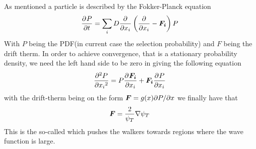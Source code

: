         As mentioned a particle is described by the Fokker-Planck equation
            \begin{equation}
                \FokkerPlanck
                \label{eq:FokkerPlanckDef}
            \end{equation}
        With $P$ being the PDF(in current case the selection probability) and
        $F$ being the drift therm. In order to achieve convergence, that is a
        stationary probability density, we need the left hand side to be zero
        in  giving the following equation
            \begin{equation}
                \prd{x_i}[P][2] = P\prd{x_i}[\mb{F_i}] + \mb{F_i}\prd{x_i}[P]
            \end{equation}
        with the drift-therm being on the form $\boldsymbol{{F}}=g(x)\mathrm{\partial} P/\mathrm{\partial} x$ we
        finally have that
            \begin{equation}
                \boldsymbol{{F}} = \frac{2}{\psi_T}\nabla \psi_T
                \label{eq:qForceDef}
            \end{equation}
        This is the so-called  which pushes the walkers
        towards regions where the wave function is large.
